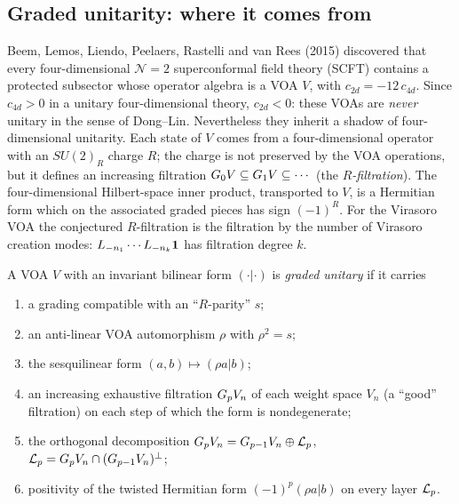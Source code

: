 \subsection{Graded unitarity: where it comes from}\label{l19:sec:ablrorigin}

Beem, Lemos, Liendo, Peelaers, Rastelli and van Rees (2015) discovered that every four-dimensional
$\mathcal N=2$ superconformal field theory (SCFT) contains a protected subsector whose operator
algebra is a VOA $V$, with $c_{2d} = -12\,c_{4d}$. Since $c_{4d}>0$ in a unitary four-dimensional
theory, $c_{2d}<0$: these VOAs are \emph{never} unitary in the sense of Dong--Lin. Nevertheless they
inherit a shadow of four-dimensional unitarity. Each state of $V$ comes from a four-dimensional
operator with an $SU(2)_R$ charge $R$; the charge is not preserved by the VOA operations, but it
defines an increasing filtration $G_0V\subseteq G_1V\subseteq\cdots$ (the
\emph{$R$-filtration}). The four-dimensional Hilbert-space inner product, transported to $V$, is a
Hermitian form which on the associated graded pieces has sign $(-1)^R$. For the Virasoro VOA the
conjectured $R$-filtration is the filtration by the number of Virasoro creation modes:
$L_{-n_1}\cdots L_{-n_k}\mathbf{1}$ has filtration degree $k$.

\begin{definition}\label{l19:def:ablrinformal}
A VOA $V$ with an invariant bilinear form $(\cdot|\cdot)$ is \emph{graded unitary} if it carries
\begin{enumerate}
\item[(i)] a grading compatible with an ``$R$-parity'' $s$;
\item[(ii)] an anti-linear VOA automorphism $\rho$ with $\rho^2 = s$;
\item[(iii)] the sesquilinear form $(a,b)\mapsto(\rho a|b)$;
\item[(iv)] an increasing exhaustive filtration $G_pV_n$ of each weight space $V_n$ (a
  ``good'' filtration) on each step of which the form is nondegenerate;
\item[(v)] the orthogonal decomposition $G_pV_n = G_{p-1}V_n\oplus
  \mathcal{L}_p$, $\mathcal{L}_p = G_pV_n\cap(G_{p-1}V_n)^\perp$;
\item[(vi)] positivity of the twisted Hermitian form $(-1)^p(\rho a|b)$ on every layer
  $\mathcal{L}_p$.
\end{enumerate}
\end{definition}

